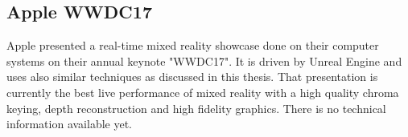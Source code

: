 \subsection{Apple WWDC17}

Apple presented a real-time mixed reality showcase done on their computer 
systems on their annual keynote "WWDC17". It is driven by Unreal Engine and 
uses also similar techniques as discussed in this thesis. That presentation is 
currently the best live performance of mixed reality with a high quality chroma 
keying, depth reconstruction and high fidelity graphics. There is no technical 
information available yet\cite{ilmxlab:mr-demo:2017}.

